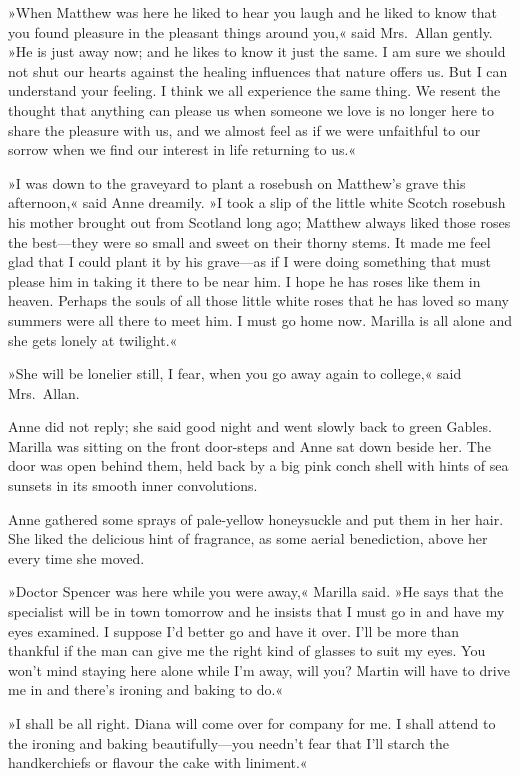 »When Matthew was here he liked to hear you laugh and he liked to know that you found pleasure in the pleasant things around you,« said Mrs.~Allan gently. »He is just away now; and he likes to know it just the same. I am sure we should not shut our hearts against the healing influences that nature offers us. But I can understand your feeling. I think we all experience the same thing. We resent the thought that anything can please us when someone we love is no longer here to share the pleasure with us, and we almost feel as if we were unfaithful to our sorrow when we find our interest in life returning to us.«

»I was down to the graveyard to plant a rosebush on Matthew's grave this afternoon,« said Anne dreamily. »I took a slip of the little white Scotch rosebush his mother brought out from Scotland long ago; Matthew always liked those roses the best—they were so small and sweet on their thorny stems. It made me feel glad that I could plant it by his grave—as if I were doing something that must please him in taking it there to be near him. I hope he has roses like them in heaven. Perhaps the souls of all those little white roses that he has loved so many summers were all there to meet him. I must go home now. Marilla is all alone and she gets lonely at twilight.«

»She will be lonelier still, I fear, when you go away again to college,« said Mrs.~Allan.

Anne did not reply; she said good night and went slowly back to green Gables. Marilla was sitting on the front door-steps and Anne sat down beside her. The door was open behind them, held back by a big pink conch shell with hints of sea sunsets in its smooth inner convolutions.

Anne gathered some sprays of pale-yellow honeysuckle and put them in her hair. She liked the delicious hint of fragrance, as some aerial benediction, above her every time she moved.

»Doctor Spencer was here while you were away,« Marilla said. »He says that the specialist will be in town tomorrow and he insists that I must go in and have my eyes examined. I suppose I'd better go and have it over. I'll be more than thankful if the man can give me the right kind of glasses to suit my eyes. You won't mind staying here alone while I'm away, will you? Martin will have to drive me in and there's ironing and baking to do.«

»I shall be all right. Diana will come over for company for me. I shall attend to the ironing and baking beautifully—you needn't fear that I'll starch the handkerchiefs or flavour the cake with liniment.«

